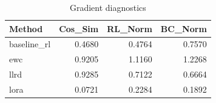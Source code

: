 \begin{table}[htbp]
\centering
\caption{Gradient diagnostics}
\label{tab:grad-diag}
\begin{tabular}{lrrr}
\toprule
\textbf{Method} & \textbf{Cos\_Sim} & \textbf{RL\_Norm} & \textbf{BC\_Norm} \\
\midrule
baseline\_rl & 0.4680 & 0.4764 & 0.7570 \\
ewc & 0.9205 & 1.1160 & 1.2268 \\
llrd & 0.9285 & 0.7122 & 0.6664 \\
lora & 0.0721 & 0.2284 & 0.1892 \\
\bottomrule
\end{tabular}
\end{table}